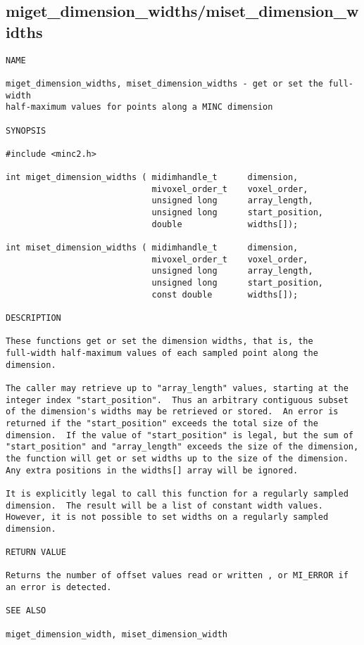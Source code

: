 \documentclass{article}
\begin{document}
\subsection{miget\_dimension\_widths/miset\_dimension\_widths}
\begin{verbatim}
NAME

miget_dimension_widths, miset_dimension_widths - get or set the full-width
half-maximum values for points along a MINC dimension

SYNOPSIS

#include <minc2.h>

int miget_dimension_widths ( midimhandle_t      dimension, 
                             mivoxel_order_t    voxel_order,
                             unsigned long      array_length, 
                             unsigned long      start_position,
                             double             widths[]);

int miset_dimension_widths ( midimhandle_t      dimension, 
                             mivoxel_order_t    voxel_order,
                             unsigned long      array_length, 
                             unsigned long      start_position,
                             const double       widths[]);

DESCRIPTION

These functions get or set the dimension widths, that is, the
full-width half-maximum values of each sampled point along the
dimension.

The caller may retrieve up to "array_length" values, starting at the
integer index "start_position".  Thus an arbitrary contiguous subset
of the dimension's widths may be retrieved or stored.  An error is
returned if the "start_position" exceeds the total size of the
dimension.  If the value of "start_position" is legal, but the sum of
"start_position" and "array_length" exceeds the size of the dimension,
the function will get or set widths up to the size of the dimension.
Any extra positions in the widths[] array will be ignored.

It is explicitly legal to call this function for a regularly sampled
dimension.  The result will be a list of constant width values.
However, it is not possible to set widths on a regularly sampled
dimension.

RETURN VALUE

Returns the number of offset values read or written , or MI_ERROR if
an error is detected.

SEE ALSO

miget_dimension_width, miset_dimension_width
\end{verbatim}
\end{document}
